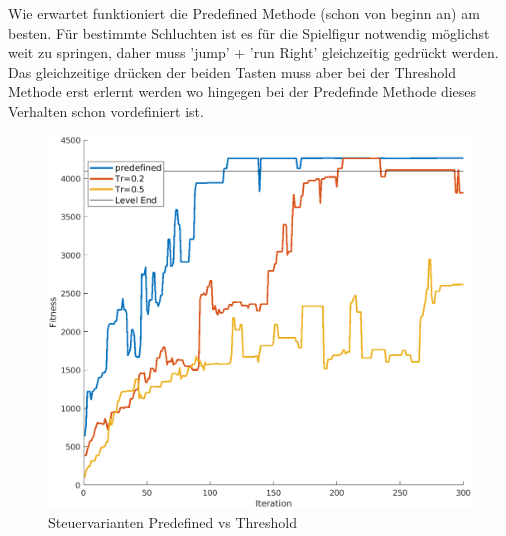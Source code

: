 \documentclass{hbrs-ecta-report}
\begin{document}
Wie erwartet funktioniert die Predefined Methode (schon von beginn an) am besten. Für bestimmte Schluchten ist es für die Spielfigur notwendig möglichst weit zu springen, daher muss 'jump' + 'run Right' gleichzeitig gedrückt werden. Das gleichzeitige drücken der beiden Tasten muss aber bei der Threshold Methode erst erlernt werden wo hingegen bei der Predefinde Methode dieses Verhalten schon vordefiniert ist.
\begin{figure}[h!]
	\centering
	\includegraphics[width=\linewidth]{img/controls.png}
	\caption{Steuervarianten Predefined vs Threshold}
	\label{fig:control}
\end{figure}

\newpage
\end{document}

